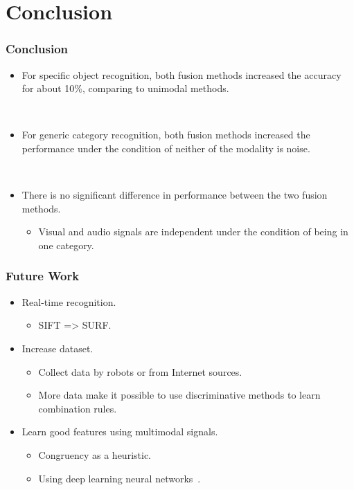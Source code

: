 \documentclass{beamer}
\begin{document}
  \section{Conclusion}
  \begin{frame}
    \frametitle{Conclusion}

    \begin{itemize}
      \item For specific object recognition, both fusion methods increased the accuracy for about 10\%, comparing to unimodal methods.

        ~
      \item For generic category recognition, both fusion methods increased the performance under the condition of neither of the modality is noise.

        ~
      \item There is no significant difference in performance between the two fusion methods.
        \begin{itemize}
          \item Visual and audio signals are independent under the condition of being in one category.
        \end{itemize}
    \end{itemize}
  \end{frame}

  \begin{frame}
    \frametitle{Future Work}

    \begin{itemize}
      \item Real-time recognition.
        \begin{itemize}
          \item SIFT => SURF.
        \end{itemize}

      \item Increase dataset.
        \begin{itemize}
          \item Collect data by robots or from Internet sources.
          \item More data make it possible to use discriminative methods to learn combination rules.
        \end{itemize}

      \item Learn good features using multimodal signals.
        \begin{itemize}
          \item Congruency as a heuristic.
          \item Using deep learning neural networks~\cite{ngiam_multimodal_2011}.
        \end{itemize}
    \end{itemize}
  \end{frame}
\end{document}
